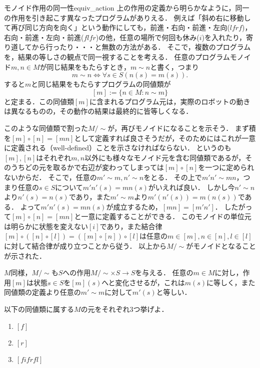 \documentclass[11pt,a4paper, dvipdfmx]{jsarticle}
\begin{document}
\begin{hatten}{モノイド作用の同一性}{equiv_action}
    上の作用の定義から明らかなように，同一の作用を引き起こす異なったプログラムがありえる．
    例えば「斜め右に移動して再び同じ方向を向く」という動作にしても，前進・右向・前進・左向($lfrf$)，右向・前進・左向・前進($flfr$)の他，任意の場所で何回も休み($i$)を入れたり，寄り道してから行ったり・・・と無数の方法がある．
    そこで，複数のプログラムを，結果の等しさの観点で同一視することを考える．
    任意のプログラムモノイド$m,n \in M$が同じ結果をもたらすとき，$m \sim n$と書く，つまり
    \[ m \sim n  \iff \forall s \in S (n(s) = m(s)). \]
    すると$m$と同じ結果をもたらすプログラムの同値類が
    \[ [m] := \{n \in M: n \sim m \} \]
    と定まる．この同値類$[m]$に含まれるプログラム元は，実際のロボットの動きは異なるものの，その動作の結果は最終的に皆等しくなる．

    このような同値類で割った$M/\sim$が，再びモノイドになることを示そう．
    まず積を$[m]\circ[n] = [mn]$として定義すれば良さそうだが，そのためにはこれが一意に定義される（well-defined）ことを示さなければならない．
    というのも$[m], [n]$はそれぞれ$m,n$以外にも様々なモノイド元を含む同値類であるが，そのうちどの元を取るかで右辺が変わってしまっては$[m]\circ[n]$を一つに定められないからだ．
    そこで，任意の$m' \sim m, n' \sim n$をとる．
    その上で$m'n' \sim mn$，つまり任意の$s \in S$について$m'n'(s) = mn(s)$がいえれば良い．
    しかし今$n' \sim n$より$n'(s) = n(s)$であり，また$m' \sim m$より$m'(n'(s)) = m(n(s))$である．
    よって$m'n'(s) = mn(s)$が成立するため，$[mn] = [m'n']$．
    したがって$[m]\circ[n] = [mn]$と一意に定義することができる．
    このモノイドの単位元は明らかに状態を変えない$[i]$であり，また結合律$[m]\circ([n]\circ[l]) = ([m]\circ[n])\circ[l]$は任意の$m \in [m], n \in [n], l \in [l]$に対して結合律が成り立つことから従う．
    以上から$M/\sim$がモノイドとなることが示された．
    
    $M$同様，$M/\sim$も$S$への作用$M/\sim \times S \to S$を与える．
    任意の$m \in M$に対し，作用$[m]$は状態$s \in S$を$[m](s)$へと変化させるが，これは$m(s)$に等しく，また同値類の定義より任意の$m' \sim m$に対して$m'(s)$と等しい．
\end{hatten}

\begin{renshu}{}{}
    以下の同値類に属する$M$の元をそれぞれ3つ挙げよ．
    \begin{enumerate}
        \item $[f]$
        \item $[r]$
        \item $[fifrfl]$
    \end{enumerate}
\end{renshu}
\end{document}
